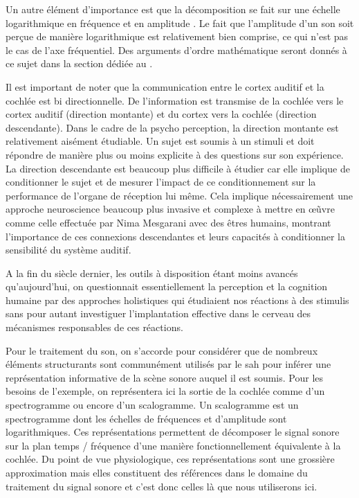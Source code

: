   Un autre élément d'importance est que la décomposition se fait sur une échelle logarithmique en fréquence et en amplitude . Le fait que l'amplitude d'un son soit perçue de manière logarithmique est relativement bien comprise, ce qui n'est pas le cas de l'axe fréquentiel. Des arguments d'ordre mathématique seront donnés à ce sujet dans la section dédiée au .

  Il est important de noter que la communication entre le cortex auditif et la cochlée est bi directionnelle. De l'information est transmise de la cochlée vers le cortex auditif (direction montante) et du cortex vers la cochlée (direction descendante). Dans le cadre de la psycho perception, la direction montante est relativement aisément étudiable. Un sujet est soumis à un stimuli et doit répondre de manière plus ou moins explicite à des questions sur son expérience. La direction descendante est beaucoup plus difficile à étudier car elle implique de conditionner le sujet et de mesurer l'impact de ce conditionnement sur la performance de l'organe de réception lui même. Cela implique nécessairement une approche \og neuroscience \fg beaucoup plus invasive et complexe à mettre en \oe\~uvre comme celle effectuée par Nima Mesgarani avec des êtres humains, montrant l'importance de ces connexions descendantes et leurs capacités à conditionner la sensibilité du système auditif\cite{mesgarani2012selective}.

  A la fin du siècle dernier, les outils à disposition étant moins avancés qu'aujourd'hui, on questionnait essentiellement la perception et la cognition humaine par des approches \og holistiques \fg qui étudiaient nos réactions à des stimulis sans pour autant investiguer l'implantation effective dans le cerveau des mécanismes responsables de ces réactions.

  Pour le traitement du son, on s'accorde pour considérer que de nombreux éléments structurants sont communément utilisés par le sah pour inférer une représentation informative de la scène sonore auquel il est soumis. Pour les besoins de l'exemple, on représentera ici la sortie de la cochlée comme d'un spectrogramme ou encore d'un scalogramme. Un scalogramme est un spectrogramme dont les échelles de fréquences et d'amplitude sont logarithmiques. Ces représentations permettent de décomposer le signal sonore sur la plan temps / fréquence d'une manière fonctionnellement équivalente à la cochlée. Du point de vue physiologique, ces représentations sont une grossière approximation\cite{lyon2017human} mais elles constituent des références dans le domaine du traitement du signal sonore et c'est donc celles là que nous utiliserons ici.

